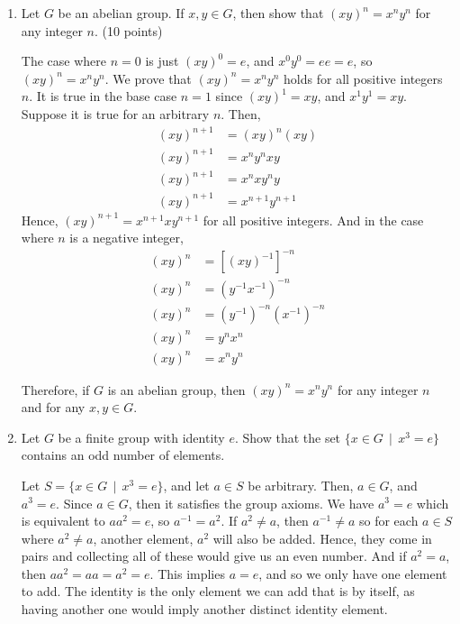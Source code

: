 \begin{enumerate}
    \item Let \(G\) be an abelian group. If \(x,y\in G\), then show that \((xy)^n = x^ny^n\) for any integer \(n\). (10 points)

    The case where \(n = 0\) is just \((xy)^0 = e\), and \(x^0y^0 = ee = e\), so \((xy)^n = x^ny^n\). We prove that \((xy)^n = x^ny^n\) holds for all positive integers \(n\). It is true in the base case \(n = 1\) since \((xy)^1 = xy\), and \(x^1y^1 = xy\). Suppose it is true for an arbitrary \(n\). Then,
    \begin{align*}
        (xy)^{n + 1} &= (xy)^n (xy) \\
        (xy)^{n + 1} &= x^ny^nxy \\
        (xy)^{n + 1} &= x^nxy^ny \\
        (xy)^{n + 1} &= x^{n+1}y^{n+1}
    \end{align*}
    Hence, \((xy)^{n + 1} = x^{n+1}xy^{n+1}\) for all positive integers. And in the case where \(n\) is a negative integer,
    \begin{align*}
        (xy)^n &= \left[(xy)^{-1}\right]^{-n} \\
        (xy)^n &= \left(y^{-1}x^{-1}\right)^{-n} \\
        (xy)^n &= (y^{-1})^{-n}(x^{-1})^{-n} \\
        (xy)^n &= y^nx^n \\
        (xy)^n &= x^ny^n
    \end{align*}

    Therefore, if \(G\) is an abelian group, then \((xy)^n = x^ny^n\) for any integer \(n\) and for any \(x,y\in G\).

    \item Let \(G\) be a finite group with identity \(e\). Show that the set \(\{x\in G \,\mid\, x^{3} = e\}\) contains an odd number of elements.

    Let \(S = \{x\in G \,\mid\, x^{3} = e\}\), and let \(a\in S\) be arbitrary. Then, \(a\in G\), and \(a^3 = e\). Since \(a\in G\), then it satisfies the group axioms. We have \(a^3 = e\) which is equivalent to \(aa^2 = e\), so \(a^{-1} = a^2\). If \(a^2 \neq a\), then \(a^{-1} \neq a\) so for each \(a\in S\) where \(a^{2} \neq a\), another element, \(a^2\) will also be added. Hence, they come in pairs and collecting all of these would give us an even number. And if \(a^2 = a\), then \(aa^2 = aa = a^2 = e\). This implies \(a = e\), and so we only have one element to add. The identity is the only element we can add that is by itself, as having another one would imply another distinct identity element.


\end{enumerate}
